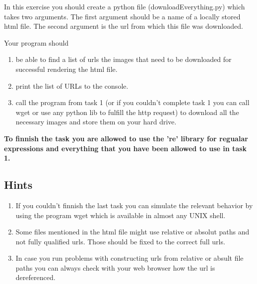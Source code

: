 \documentclass{WeSTassignment}
\begin{document}
In this exercise you should create a python file (downloadEverything.py) which takes two arguments. The first argument should be a name of a locally stored html file. The second argument is the url from which this file was downloaded.

Your program should 
\begin{enumerate}
\item be able to find a list of urls the images that need to be downloaded for successful rendering the html file.
\item print the list of URLs to the console.
\item call the program from task 1 (or if you couldn't complete task 1 you can call wget or use any python lib to fulfill the http request) to download all the necessary images and store them on your hard drive.
\end{enumerate}

\textbf{To finnish the task you are allowed to use the 're' library for regualar expressions and everything that you have been allowed to use in task 1.}

\subsection{Hints}
\begin{enumerate}
\item If you couldn't finnish the last task you can simulate the relevant behavior by using the program wget which is available in almost any UNIX shell. 
\item Some files mentioned in the html file might use relative or absolut paths and not fully qualified urls. Those should be fixed to the correct full urls. 
\item In case you run problems with constructing urls from relative or absult file paths you can always check with your web browser how the url is dereferenced. \\
\end{enumerate}
\end{document}
